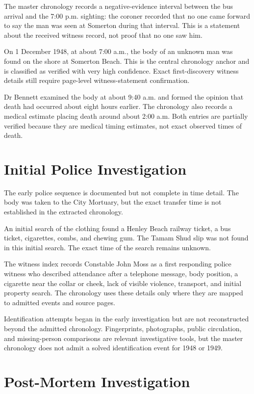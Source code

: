 The master chronology records a negative-evidence interval between the bus arrival and the 7:00 p.m. sighting: the coroner recorded that no one came forward to say the man was seen at Somerton during that interval. This is a statement about the received witness record, not proof that no one saw him.

On 1 December 1948, at about 7:00 a.m., the body of an unknown man was found on the shore at Somerton Beach. This is the central chronology anchor and is classified as verified with very high confidence. Exact first-discovery witness details still require page-level witness-statement confirmation.

Dr Bennett examined the body at about 9:40 a.m. and formed the opinion that death had occurred about eight hours earlier. The chronology also records a medical estimate placing death around about 2:00 a.m. Both entries are partially verified because they are medical timing estimates, not exact observed times of death.

\section{Initial Police Investigation}

The early police sequence is documented but not complete in time detail. The body was taken to the City Mortuary, but the exact transfer time is not established in the extracted chronology.

An initial search of the clothing found a Henley Beach railway ticket, a bus ticket, cigarettes, combs, and chewing gum. The Tamam Shud slip was not found in this initial search. The exact time of the search remains unknown.

The witness index records Constable John Moss as a first responding police witness who described attendance after a telephone message, body position, a cigarette near the collar or cheek, lack of visible violence, transport, and initial property search. The chronology uses these details only where they are mapped to admitted events and source pages.

Identification attempts began in the early investigation but are not reconstructed beyond the admitted chronology. Fingerprints, photographs, public circulation, and missing-person comparisons are relevant investigative tools, but the master chronology does not admit a solved identification event for 1948 or 1949.

\section{Post-Mortem Investigation}

